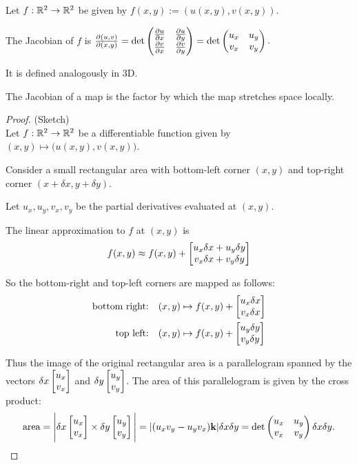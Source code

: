 \begin{definition*}[Jacobian]
  Let $f:\mathbb{R}^2 \to \mathbb{R}^2$ be given by $f(x, y) := (u(x, y), v(x, y))$.

  The Jacobian of $f$ is
  $
  \frac{\partial(u, v)}{\partial(x, y)} =
  \det \begin{pmatrix}\frac{\partial u}{\partial x} & \frac{\partial u}{\partial y}\\\frac{\partial v}{\partial x} & \frac{\partial v}{\partial y}\\ \end{pmatrix}
  = \det \begin{pmatrix}u_x & u_y\\v_x & v_y\\ \end{pmatrix}.
  $

  It is defined analogously in 3D.
\end{definition*}

\begin{theorem}\label{stretch-factor-is-jacobian}
  The Jacobian of a map is the factor by which the map stretches space locally.
\end{theorem}

\begin{proof}(Sketch)\\
  Let $f: \mathbb{R}^2\to\mathbb{R}^2$ be a differentiable function given by
  $(x,y) \mapsto \Big(u(x,y), v(x,y)\Big)$.

  Consider a small rectangular area with bottom-left corner $(x, y)$ and top-right corner
  $(x + \delta x, y + \delta y)$.

  Let $u_x, u_y, v_x, v_y$ be the partial derivatives evaluated at $(x, y)$.

  The linear approximation to $f$ at $(x, y)$ is
  \begin{align*}
    f(x, y) \approx  f(x, y) +
    \begin{bmatrix}u_x\delta x + u_y\delta y\\v_x\delta x + v_y\delta y\end{bmatrix}
  \end{align*}

  So the bottom-right and top-left corners are mapped as follows:
  \begin{align*}
    \text{bottom right:~~~}&
                             (x, y) \mapsto f(x, y) +
                             \begin{bmatrix}u_x\delta x\\v_x\delta x\end{bmatrix}
    \\
    \text{top left:~~~}&
                         (x, y) \mapsto f(x, y) +
                         \begin{bmatrix}u_y\delta y\\v_y\delta y\end{bmatrix}
  \end{align*}

  Thus the image of the original rectangular area is a parallelogram spanned by the vectors
  $\delta x\begin{bmatrix}u_x\\v_x\end{bmatrix}$ and $\delta y\begin{bmatrix}u_y\\v_y\end{bmatrix}$. The area of this parallelogram is given by
  the cross product:
  \begin{align*}
    \text{area}
    = \Bigg|\delta x\begin{bmatrix}u_x\\v_x\end{bmatrix} \times
    \delta y\begin{bmatrix}u_y\\v_y\end{bmatrix}\Bigg|
    = |(u_xv_y - u_yv_x)\mathbf{k}|\delta x \delta y
    = \det \begin{pmatrix}u_x & u_y\\v_x & v_y\\ \end{pmatrix} \delta x \delta y.
  \end{align*}


\end{proof}


